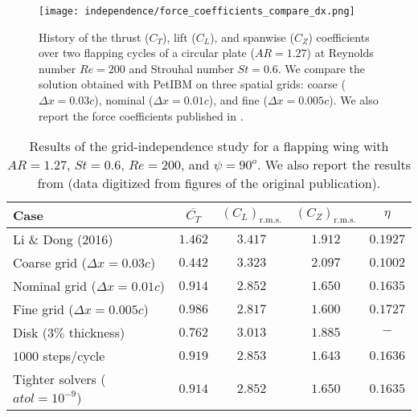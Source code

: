 \begin{figure}[!h]
  \centering
  \texttt{[image: independence/force\_coefficients\_compare\_dx.png]}
  \caption{History of the thrust ($C_T$), lift ($C_L$), and spanwise ($C_Z$) coefficients over two flapping cycles of a circular plate ($AR = 1.27$) at Reynolds number $Re = 200$ and Strouhal number $St = 0.6$. We compare the solution obtained with PetIBM on three spatial grids: coarse ($\Delta x = 0.03c$), nominal ($\Delta x = 0.01c$), and fine ($\Delta x = 0.005c$). We also report the force coefficients published in \citet{li_dong_2016}.}
  \label{fig:independence_force_coefficients_dx}
\end{figure}

\begin{table}[!h]
  \centering
  \begin{tabular}{lcccc}
    \hline\hline
    Case & $\overline{C_T}$ & $\left( C_L \right)_\text{r.m.s.}$ & $\left( C_Z \right)_\text{r.m.s.}$ & $\eta$ \\
    \hline
    Li \& Dong (2016) & $1.462$ & $3.417$ & $1.912$ & $0.1927$ \\
    Coarse grid ($\Delta x = 0.03c$) & $0.442$ & $3.323$ & $2.097$ & $0.1002$ \\
    Nominal grid ($\Delta x = 0.01c$) & $0.914$ & $2.852$ & $1.650$ & $0.1635$ \\
    Fine grid ($\Delta x = 0.005c$) & $0.986$ & $2.817$ & $1.600$ & $0.1727$ \\
    Disk ($3\%$ thickness) & $0.762$ & $3.013$ & $1.885$ & $-$ \\
    $1000$ steps/cycle & $0.919$ & $2.853$ & $1.643$ & $0.1636$ \\
    Tighter solvers ($atol = 10^{-9}$) & $0.914$ & $2.852$ & $1.650$ & $0.1635$ \\
    \hline\hline
  \end{tabular}
  \caption{Results of the grid-independence study for a flapping wing with $AR = 1.27$, $St = 0.6$, $Re = 200$, and $\psi = 90^o$. We also report the results from \citet{li_dong_2016} (data digitized from figures of the original publication).}
  \label{tab:independence_results}
\end{table}

